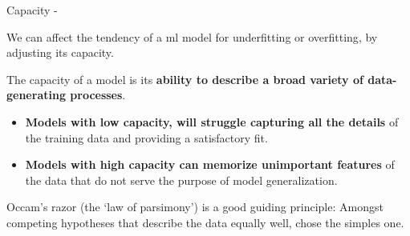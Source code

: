 
\begin{frame}[t,allowframebreaks]{Capacity -}

    We can affect the tendency of a \gls{ml} model for 
    \gls{underfitting} or 
    \gls{overfitting},
    by adjusting its 
    \gls{capacity}.\\

    \vspace{0.2cm}

    The \gls{capacity} of a model is its 
    {\bf ability to describe a broad variety of data-generating processes}.

    \vspace{0.2cm}

    \begin{itemize}
        \item 
        {\bf Models with low capacity, 
        will struggle capturing all the details} 
        of the training data and providing a satisfactory fit.\\
        \item 
        {\bf Models with high capacity 
        can memorize unimportant features} of the data
        that do not serve the purpose of model generalization.
    \end{itemize}

    \vspace{0.2cm}

    Occam's razor (the `law of parsimony')
    \cite{Wikipedia:OccamRazor} is a good guiding principle:
    Amongst competing hypotheses that describe the data equally well,
    chose the simples one.\\

    \vspace{0.2cm}


\end{frame}
